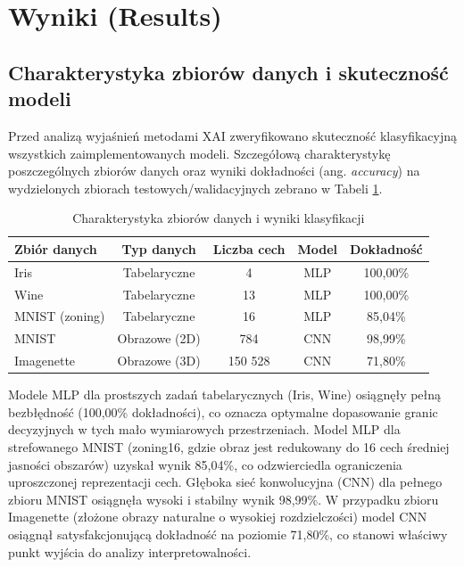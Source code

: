 \documentclass[conference]{IEEEtran}
\begin{document}
\section{Wyniki (Results)}

\subsection{Charakterystyka zbiorów danych i skuteczność modeli}
Przed analizą wyjaśnień metodami XAI zweryfikowano skuteczność klasyfikacyjną wszystkich zaimplementowanych modeli. Szczegółową charakterystykę poszczególnych zbiorów danych oraz wyniki dokładności (ang. \textit{accuracy}) na wydzielonych zbiorach testowych/walidacyjnych zebrano w Tabeli \ref{tab:datasets}.

\begin{table}[htbp]
\caption{Charakterystyka zbiorów danych i wyniki klasyfikacji}
\label{tab:datasets}
\begin{center}
\begin{tabular}{|l|c|c|c|c|}
\hline
\textbf{Zbiór danych} & \textbf{Typ danych} & \textbf{Liczba cech} & \textbf{Model} & \textbf{Dokładność} \\
\hline
Iris & Tabelaryczne & 4 & MLP & 100,00\% \\
Wine & Tabelaryczne & 13 & MLP & 100,00\% \\
MNIST (zoning) & Tabelaryczne & 16 & MLP & 85,04\% \\
MNIST & Obrazowe (2D) & 784 & CNN & 98,99\% \\
Imagenette & Obrazowe (3D) & 150 528 & CNN & 71,80\% \\
\hline
\end{tabular}
\end{center}
\end{table}

Modele MLP dla prostszych zadań tabelarycznych (Iris, Wine) osiągnęły pełną bezbłędność (100,00\% dokładności), co oznacza optymalne dopasowanie granic decyzyjnych w tych mało wymiarowych przestrzeniach. Model MLP dla strefowanego MNIST (zoning16, gdzie obraz jest redukowany do 16 cech średniej jasności obszarów) uzyskał wynik 85,04\%, co odzwierciedla ograniczenia uproszczonej reprezentacji cech. Głęboka sieć konwolucyjna (CNN) dla pełnego zbioru MNIST osiągnęła wysoki i stabilny wynik 98,99\%. W przypadku zbioru Imagenette (złożone obrazy naturalne o wysokiej rozdzielczości) model CNN osiągnął satysfakcjonującą dokładność na poziomie 71,80\%, co stanowi właściwy punkt wyjścia do analizy interpretowalności.
\end{document}
